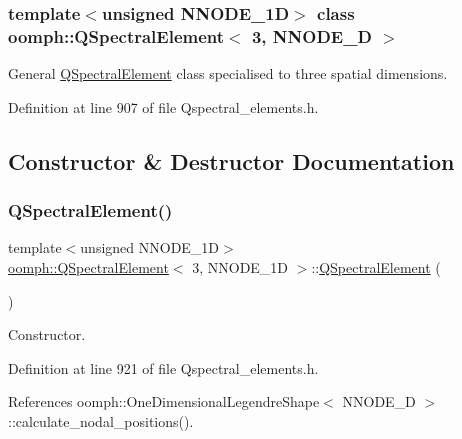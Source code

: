 \subsubsection*{template$<$unsigned N\+N\+O\+D\+E\+\_\+1D$>$\newline
class oomph\+::\+Q\+Spectral\+Element$<$ 3, N\+N\+O\+D\+E\+\_\+D $>$}

General \hyperlink{classoomph_1_1QSpectralElement}{Q\+Spectral\+Element} class specialised to three spatial dimensions. 

Definition at line 907 of file Qspectral\+\_\+elements.\+h.



\subsection{Constructor \& Destructor Documentation}
\mbox{\label{classoomph_1_1QSpectralElement_3_013_00_01NNODE__1D_01_4_a16dc807addb7036c30d794d65d2a0b73}} 
\subsubsection{\texorpdfstring{Q\+Spectral\+Element()}{QSpectralElement()}}
{\footnotesize\ttfamily template$<$unsigned N\+N\+O\+D\+E\+\_\+1D$>$ \\
\hyperlink{classoomph_1_1QSpectralElement}{oomph\+::\+Q\+Spectral\+Element}$<$ 3, N\+N\+O\+D\+E\+\_\+1D $>$\+::\hyperlink{classoomph_1_1QSpectralElement}{Q\+Spectral\+Element} (\begin{DoxyParamCaption}{ }\end{DoxyParamCaption})\hspace{0.3cm}{\ttfamily [inline]}}



Constructor. 



Definition at line 921 of file Qspectral\+\_\+elements.\+h.



References oomph\+::\+One\+Dimensional\+Legendre\+Shape$<$ N\+N\+O\+D\+E\+\_\+D $>$\+::calculate\+\_\+nodal\+\_\+positions().



